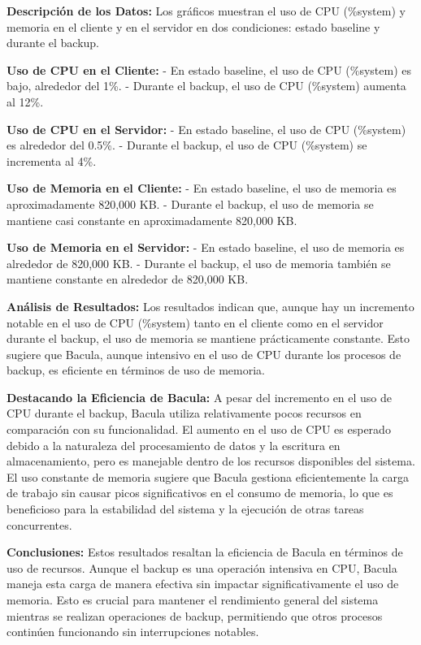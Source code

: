 \textbf{Descripción de los Datos:}
Los gráficos muestran el uso de CPU (\%system) y memoria en el cliente y en el servidor en dos condiciones: estado baseline y durante el backup.

\textbf{Uso de CPU en el Cliente:}
- En estado baseline, el uso de CPU (\%system) es bajo, alrededor del 1\%.
- Durante el backup, el uso de CPU (\%system) aumenta al 12\%.

\textbf{Uso de CPU en el Servidor:}
- En estado baseline, el uso de CPU (\%system) es alrededor del 0.5\%.
- Durante el backup, el uso de CPU (\%system) se incrementa al 4\%.

\textbf{Uso de Memoria en el Cliente:}
- En estado baseline, el uso de memoria es aproximadamente 820,000 KB.
- Durante el backup, el uso de memoria se mantiene casi constante en aproximadamente 820,000 KB.

\textbf{Uso de Memoria en el Servidor:}
- En estado baseline, el uso de memoria es alrededor de 820,000 KB.
- Durante el backup, el uso de memoria también se mantiene constante en alrededor de 820,000 KB.

\textbf{Análisis de Resultados:}
Los resultados indican que, aunque hay un incremento notable en el uso de CPU (\%system) tanto en el cliente como en el servidor durante el backup, el uso de memoria se mantiene prácticamente constante. Esto sugiere que Bacula, aunque intensivo en el uso de CPU durante los procesos de backup, es eficiente en términos de uso de memoria.

\textbf{Destacando la Eficiencia de Bacula:}
A pesar del incremento en el uso de CPU durante el backup, Bacula utiliza relativamente pocos recursos en comparación con su funcionalidad. El aumento en el uso de CPU es esperado debido a la naturaleza del procesamiento de datos y la escritura en almacenamiento, pero es manejable dentro de los recursos disponibles del sistema. El uso constante de memoria sugiere que Bacula gestiona eficientemente la carga de trabajo sin causar picos significativos en el consumo de memoria, lo que es beneficioso para la estabilidad del sistema y la ejecución de otras tareas concurrentes.

\textbf{Conclusiones:}
Estos resultados resaltan la eficiencia de Bacula en términos de uso de recursos. Aunque el backup es una operación intensiva en CPU, Bacula maneja esta carga de manera efectiva sin impactar significativamente el uso de memoria. Esto es crucial para mantener el rendimiento general del sistema mientras se realizan operaciones de backup, permitiendo que otros procesos continúen funcionando sin interrupciones notables.

